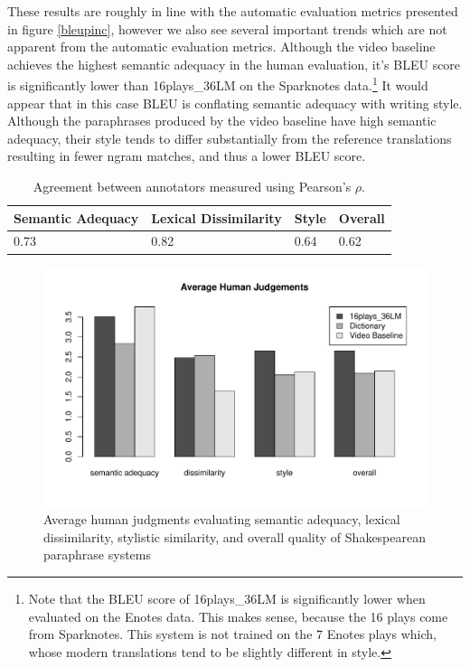 \documentclass[10pt,a5paper,twoside]{article}
\begin{document}
These results are roughly in line with the automatic evaluation metrics presented in figure \ref{bleupinc}, however we also see several important
trends which are not apparent from the automatic evaluation metrics.
Although the video baseline achieves the highest semantic adequacy in the human evaluation, it's BLEU score
is significantly lower than 16plays\_36LM on the Sparknotes data.\footnote{
Note that the BLEU score of 16plays\_36LM is significantly lower when evaluated on the Enotes data.  This makes sense, because the 
16 plays come from Sparknotes. This system is not trained on the 7 Enotes plays which, whose modern translations tend
to be slightly different in style.}
It would appear that in this case BLEU is conflating semantic adequacy with writing style.  Although the paraphrases produced 
by the video baseline have high semantic adequacy, their style tends to differ substantially from the reference translations resulting
in fewer ngram matches, and thus a lower BLEU score.

\begin{table}
  \begin{center}
    \begin{tabular}{|l|l|l|l|}
      \hline
      Semantic Adequacy & Lexical Dissimilarity & Style & Overall \\
      \hline
      \hline
      0.73 & 0.82 & 0.64 & 0.62 \\
      \hline
    \end{tabular}
  \end{center}
  \caption{Agreement between annotators measured using Pearson's $\rho$.}
  \label{annotator_agreement}
\end{table}

\begin{figure}[ht]
  \begin{center}
    \includegraphics[width=5in]{figures/human_judgements.pdf}
  \end{center}
  \caption{Average human judgments evaluating semantic adequacy, lexical dissimilarity, stylistic similarity, and overall quality
    of Shakespearean paraphrase systems} 
  \label{human_judgements}
\end{figure}
\end{document}
